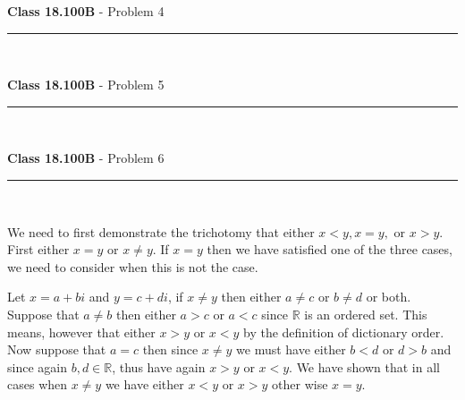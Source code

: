 \documentclass[11pt,reqno]{article}
\begin{document}
\vspace{15pt}
\begin{flushleft} 
\textbf{Class 18.100B} - Problem 4\\
\rule{500pt}{1pt}\\
\end{flushleft} 

\vspace{15pt}
\begin{flushleft} 
\textbf{Class 18.100B} - Problem 5\\
\rule{500pt}{1pt}\\
\end{flushleft} 



\vspace{15pt}
\begin{flushleft} 
\textbf{Class 18.100B} - Problem 6\\
\rule{500pt}{1pt}\\
\end{flushleft} 


We need to first demonstrate the trichotomy that either $x < y, x = y,$ or $x > y$. First either $x = y$ or $x \neq y$. If $x = y$ then we have satisfied one of the three cases, we need to consider when this is not the case.

Let $x = a + bi$ and $y = c + di$, if $x \neq y$ then either $a \neq c$ or $b \neq d$ or both. Suppose that $a \neq b$ then either $a > c$ or $a < c$ since $\mathbb{R}$ is an ordered set. This means, however that either $x > y$ or $x < y$ by the definition of dictionary order. Now suppose that $a = c$ then since $x \neq y$ we must have either $b < d$ or $d > b$ and since again $b, d \in \mathbb{R}$, thus have again $x > y$ or $x < y$. We have shown that in all cases when $x \neq y$ we have either $x < y$ or $x > y$ other wise $x = y$.
\end{document}
